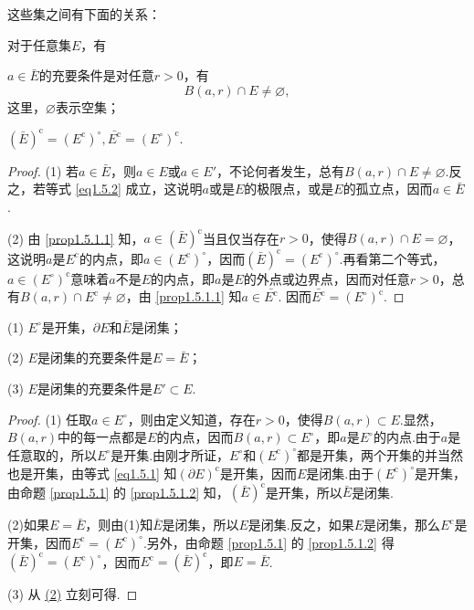 这些集之间有下面的关系：
\begin{prop}\label{prop1.5.1}
  对于任意集$E$，有
  \begin{eenum}
    \item $a\in\bar E$的充要条件是对任意$r>0$，有\label{prop1.5.1.1}
    \begin{equation}\label{eq1.5.2}
       B(a,r)\cap E\ne\varnothing,
    \end{equation}
    这里，$\varnothing$表示空集；
    \item $(\bar E)^{\mathrm c}=(E^{\mathrm c})^\circ,\bar {E^{\mathrm c}}=(E^\circ)^{\mathrm c}$.\label{prop1.5.1.2}
  \end{eenum}
\end{prop}
\begin{proof}
(1) 若$a\in\bar E$，则$a\in E$或$a\in E'$，不论何者发生，总有$B(a,r)\cap E\ne\varnothing$.反之，若等式 \eqref{eq1.5.2} 成立，这说明$a$或是$E$的极限点，或是$E$的孤立点，因而$a\in\bar E$.

(2) 由 \ref{prop1.5.1.1} 知，$a\in(\bar E)^{\mathrm c}$当且仅当存在$r>0$，使得$B(a,r)\cap E=\varnothing$，这说明$a$是$E^{\mathrm c}$的内点，即$a\in (E^{\mathrm c})^\circ$，因而$(\bar E)^{\mathrm c}=(E^{\mathrm c})^\circ$.再看第二个等式，$a\in (E^\circ)^{\mathrm c}$意味着$a$不是$E$的内点，即$a$是$E$的外点或边界点，因而对任意$r>0$，总有$B(a,r)\cap E^{\mathrm c}\ne\varnothing$，由 \ref{prop1.5.1.1} 知$a\in \bar{E^{\mathrm c}}$. 因而$\bar {E^{\mathrm c}}=(E^\circ)^{\mathrm c}$.
\end{proof}

\begin{prop}\label{prop1.5.2}
  (1) \hypertarget{prop1.5.2.1}{}$E^\circ$是开集，$\partial E$和$\bar E$是闭集；\par
  (2) \hypertarget{prop1.5.2.2}{}$E$是闭集的充要条件是$E=\bar E$；\par
  (3) \hypertarget{prop1.5.2.3}{}$E$是闭集的充要条件是$E'\subset E$.
\end{prop}
\begin{proof}
  (1) 任取$a\in E^\circ$，则由定义知道，存在$r>0$，使得$B(a,r)\subset E$.显然，$B(a,r)$中的每一点都是$E$的内点，因而$B(a,r)\subset E^\circ$，即$a$是$E^\circ$的内点.由于$a$是任意取的，所以$E^\circ$是开集.由刚才所证，$E^\circ$和$(E^{\mathrm c})^\circ$都是开集，两个开集的并当然也是开集，由等式 \eqref{eq1.5.1} 知$(\partial E)^{\mathrm c}$是开集，因而$E$是闭集.由于$(E^{\mathrm c})^\circ$是开集，由命题 \ref{prop1.5.1} 的 \ref{prop1.5.1.2}  知，$(\bar E)^{\mathrm c}$是开集，所以$\bar E$是闭集.
  \par
  (2)如果$E=\bar E$，则由(1)知$\bar E$是闭集，所以$E$是闭集.反之，如果$E$是闭集，那么$E^{\mathrm c}$是开集，因而$E^{\mathrm c}=(E^{\mathrm c})^\circ$.另外，由命题 \ref{prop1.5.1} 的 \ref{prop1.5.1.2} 得$(\bar E)^{\mathrm c}=(E^{\mathrm c})^\circ$，因而$E^{\mathrm c}=(\bar E)^{\mathrm c}$，即$E=\bar E$.
  \par
  (3) 从 \hyperlink{prop1.5.2.2}{(2)} 立刻可得.
\end{proof}

